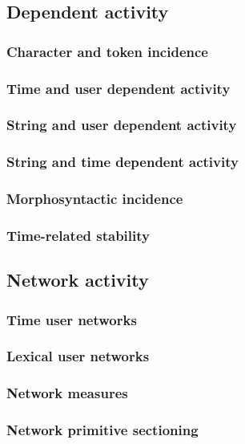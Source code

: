 \documentclass[a4paper, 11pt]{article} %
\begin{document}
\subsection{Dependent activity}
\subsubsection{Character and token incidence}
\subsubsection{Time and user dependent activity}
\subsubsection{String and user dependent activity}
\subsubsection{String and time dependent activity}
\subsubsection{Morphosyntactic incidence}
\subsubsection{Time-related stability}
\subsection{Network activity}
\subsubsection{Time user networks}

\subsubsection{Lexical user networks}

\subsubsection{Network measures}

\subsubsection{Network primitive sectioning}
\end{document}
